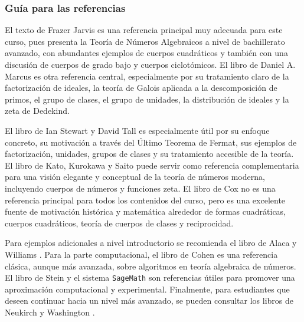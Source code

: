 \begin{refsection}
\subsubsection*{Guía para las referencias}

El texto de Frazer Jarvis \cite{Jar14} es una referencia principal muy adecuada para este curso, pues presenta la Teoría de Números Algebraicos a nivel de bachillerato avanzado, con abundantes ejemplos de cuerpos cuadráticos y también con una discusión de cuerpos de grado bajo y cuerpos ciclotómicos. El libro de Daniel A. Marcus \cite{Mar18} es otra referencia central, especialmente por su tratamiento claro de la factorización de ideales, la teoría de Galois aplicada a la descomposición de primos, el grupo de clases, el grupo de unidades, la distribución de ideales y la zeta de Dedekind.

El libro de Ian Stewart y David Tall \cite{SteTal25} es especialmente útil por su enfoque concreto, su motivación a través del Último Teorema de Fermat, sus ejemplos de factorización, unidades, grupos de clases y su tratamiento accesible de la teoría. El libro de Kato, Kurokawa y Saito \cite{KKS00} puede servir como referencia complementaria para una visión elegante y conceptual de la teoría de números moderna, incluyendo cuerpos de números y funciones zeta. El libro de Cox \cite{Cox22} no es una referencia principal para todos los contenidos del curso, pero es una excelente fuente de motivación histórica y matemática alrededor de formas cuadráticas, cuerpos cuadráticos, teoría de cuerpos de clases y reciprocidad.

Para ejemplos adicionales a nivel introductorio se recomienda el libro de Alaca y Williams \cite{AW04}. Para la parte computacional, el libro de Cohen \cite{Coh93} es una referencia clásica, aunque más avanzada, sobre algoritmos en teoría algebraica de números. El libro de Stein \cite{Ste09} y el sistema \texttt{SageMath} \cite{SageMath109} son referencias útiles para promover una aproximación computacional y experimental. Finalmente, para estudiantes que deseen continuar hacia un nivel más avanzado, se pueden consultar los libros de Neukirch \cite{Neu99} y Washington \cite{Was97}.



\nocite{Jar14}
\nocite{Mar18}
\nocite{SteTal25}
\nocite{KKS00}
\nocite{Cox22}
\nocite{AW04}
\nocite{Coh93}
\nocite{Ste09}
\nocite{SageMath109}
\nocite{Neu99}
\nocite{Was97}

\printcursosbibliography
\end{refsection}
